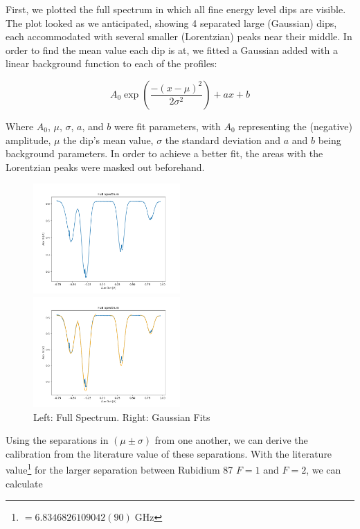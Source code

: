 \documentclass[12pt, a4paper]{article}
\let\oldexp\exp
\renewcommand{\exp}[1]{\ensuremath{\oldexp \left( #1 \right)}}
\begin{document}
First, we plotted the full spectrum in which all fine energy level dips are visible. The plot looked as we anticipated, showing 4 separated large (Gaussian) dips, each accommodated with several smaller (Lorentzian) peaks near their middle. In order to find the mean value each dip is at, we fitted a Gaussian added with a linear background function to each of the profiles:

\begin{equation}
A_0 \exp{\frac{-(x - \mu)^2}{2 \sigma^2}} + ax + b
\label{gaussianfit}
\end{equation}

Where $A_0$, $\mu$, $\sigma$, $a$, and $b$ were fit parameters, with $A_0$ representing the (negative) amplitude, $\mu$ the dip's mean value, $\sigma$ the standard deviation and $a$ and $b$ being background parameters. In order to achieve a better fit, the areas with the Lorentzian peaks were masked out beforehand.

\begin{figure}
    \centering
    \parbox{0.45\textwidth}{
        \includegraphics[width=0.5\textwidth]{fullspectrum.png}
    }
    \hfill
    \parbox{0.45\textwidth}{
        \includegraphics[width=0.5\textwidth]{fullspectrumgaussian}    
    }
    \caption{Left: Full Spectrum. Right: Gaussian Fits}
\end{figure}

Using the separations in $(\mu \pm \sigma)$ from one another, we can derive the calibration from the literature value of these separations. With the literature value\footnote{$= 6.8346826109042(90)\;\si{\giga\hertz}$\cite{script}} for the larger separation between Rubidium 87 $F = 1$ and $F = 2$, we can calculate
\end{document}

